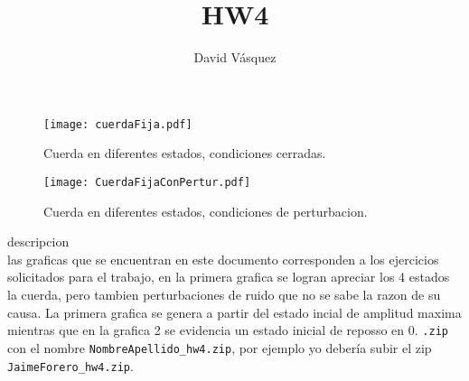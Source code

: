 \documentclass[12pt,letterpaper]{article}
\title{HW4}
\author{David Vásquez}
\begin{document}
\begin{figure}[h]
\texttt{[image: cuerdaFija.pdf]}
\centering
    \caption{Cuerda en diferentes estados, condiciones cerradas.}
\end{figure}

\begin{figure}[h]
\texttt{[image: CuerdaFijaConPertur.pdf]}
\centering
    \caption{Cuerda en diferentes estados, condiciones de perturbacion.}
\end{figure}
{\Large descripcion}\\

\noindent
las graficas que se encuentran en este documento corresponden a los ejercicios solicitados para el trabajo, en la primera grafica se logran apreciar los 4 estados la cuerda, pero tambien perturbaciones de ruido que no se sabe la razon de su causa.
\noindent
La primera grafica se genera a partir del estado incial de amplitud maxima mientras que en la grafica 2 se evidencia un estado inicial de reposso en 0. 
\verb".zip" con el nombre \verb"NombreApellido_hw4.zip", por ejemplo
yo deber\'ia subir el zip \verb"JaimeForero_hw4.zip".
\end{document}

